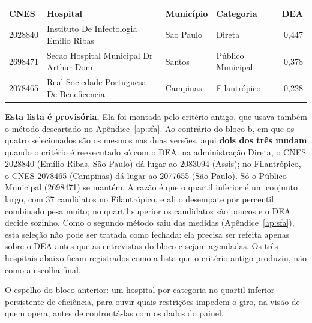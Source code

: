 \begin{center}\small
\begin{tabular}{llllr}
\toprule
CNES & Hospital & Município & Categoria & DEA \\
\midrule
2028840 & Instituto De Infectologia Emilio Ribas & Sao Paulo & Direta & 0,447 \\
2698471 & Secao Hospital Municipal Dr Arthur Dom & Santos & Público Municipal & 0,378 \\
2078465 & Real Sociedade Portuguesa De Beneficencia & Campinas & Filantrópico & 0,228 \\
\bottomrule
\end{tabular}
\end{center}

\noindent\textbf{Esta lista é provisória.} Ela foi montada pelo critério
antigo, que usava também o método descartado no
Apêndice~\ref{ap:sfa}. Ao contrário do bloco b, em que os quatro
selecionados são os mesmos nas duas versões, aqui \textbf{dois dos três
mudam} quando o critério é reexecutado só com o DEA: na administração Direta, o CNES
2028840 (Emílio Ribas, São Paulo) dá lugar ao 2083094 (Assis); no
Filantrópico, o CNES 2078465 (Campinas) dá lugar ao 2077655 (São Paulo).
Só o Público Municipal (2698471) se mantém. A razão é que o quartil
inferior é um conjunto largo, com 37 candidatos no Filantrópico, e ali o
desempate por percentil combinado pesa muito; no quartil superior os
candidatos são poucos e o DEA decide sozinho. Como o segundo método saiu
das medidas (Apêndice~\ref{ap:sfa}), esta seleção não pode ser tratada
como fechada: ela precisa ser refeita apenas sobre o DEA antes que as
entrevistas do bloco c sejam agendadas. Os três hospitais abaixo ficam
registrados como a lista que o critério antigo produziu, não como a
escolha final.

O espelho do bloco anterior: um hospital por categoria no quartil
inferior persistente de eficiência, para ouvir quais restrições
impedem o giro, na visão de quem opera, antes de confrontá-las com os
dados do painel.

